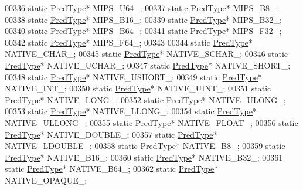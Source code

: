 \begin{DoxyCode}
00336         \textcolor{keyword}{static} \hyperlink{class_h5_1_1_pred_type}{PredType}* MIPS\_U64\_;
00337         \textcolor{keyword}{static} \hyperlink{class_h5_1_1_pred_type}{PredType}* MIPS\_B8\_;
00338         \textcolor{keyword}{static} \hyperlink{class_h5_1_1_pred_type}{PredType}* MIPS\_B16\_;
00339         \textcolor{keyword}{static} \hyperlink{class_h5_1_1_pred_type}{PredType}* MIPS\_B32\_;
00340         \textcolor{keyword}{static} \hyperlink{class_h5_1_1_pred_type}{PredType}* MIPS\_B64\_;
00341         \textcolor{keyword}{static} \hyperlink{class_h5_1_1_pred_type}{PredType}* MIPS\_F32\_;
00342         \textcolor{keyword}{static} \hyperlink{class_h5_1_1_pred_type}{PredType}* MIPS\_F64\_;
00343 
00344         \textcolor{keyword}{static} \hyperlink{class_h5_1_1_pred_type}{PredType}* NATIVE\_CHAR\_;
00345         \textcolor{keyword}{static} \hyperlink{class_h5_1_1_pred_type}{PredType}* NATIVE\_SCHAR\_;
00346         \textcolor{keyword}{static} \hyperlink{class_h5_1_1_pred_type}{PredType}* NATIVE\_UCHAR\_;
00347         \textcolor{keyword}{static} \hyperlink{class_h5_1_1_pred_type}{PredType}* NATIVE\_SHORT\_;
00348         \textcolor{keyword}{static} \hyperlink{class_h5_1_1_pred_type}{PredType}* NATIVE\_USHORT\_;
00349         \textcolor{keyword}{static} \hyperlink{class_h5_1_1_pred_type}{PredType}* NATIVE\_INT\_;
00350         \textcolor{keyword}{static} \hyperlink{class_h5_1_1_pred_type}{PredType}* NATIVE\_UINT\_;
00351         \textcolor{keyword}{static} \hyperlink{class_h5_1_1_pred_type}{PredType}* NATIVE\_LONG\_;
00352         \textcolor{keyword}{static} \hyperlink{class_h5_1_1_pred_type}{PredType}* NATIVE\_ULONG\_;
00353         \textcolor{keyword}{static} \hyperlink{class_h5_1_1_pred_type}{PredType}* NATIVE\_LLONG\_;
00354         \textcolor{keyword}{static} \hyperlink{class_h5_1_1_pred_type}{PredType}* NATIVE\_ULLONG\_;
00355         \textcolor{keyword}{static} \hyperlink{class_h5_1_1_pred_type}{PredType}* NATIVE\_FLOAT\_;
00356         \textcolor{keyword}{static} \hyperlink{class_h5_1_1_pred_type}{PredType}* NATIVE\_DOUBLE\_;
00357         \textcolor{keyword}{static} \hyperlink{class_h5_1_1_pred_type}{PredType}* NATIVE\_LDOUBLE\_;
00358         \textcolor{keyword}{static} \hyperlink{class_h5_1_1_pred_type}{PredType}* NATIVE\_B8\_;
00359         \textcolor{keyword}{static} \hyperlink{class_h5_1_1_pred_type}{PredType}* NATIVE\_B16\_;
00360         \textcolor{keyword}{static} \hyperlink{class_h5_1_1_pred_type}{PredType}* NATIVE\_B32\_;
00361         \textcolor{keyword}{static} \hyperlink{class_h5_1_1_pred_type}{PredType}* NATIVE\_B64\_;
00362         \textcolor{keyword}{static} \hyperlink{class_h5_1_1_pred_type}{PredType}* NATIVE\_OPAQUE\_;

\end{DoxyCode}
